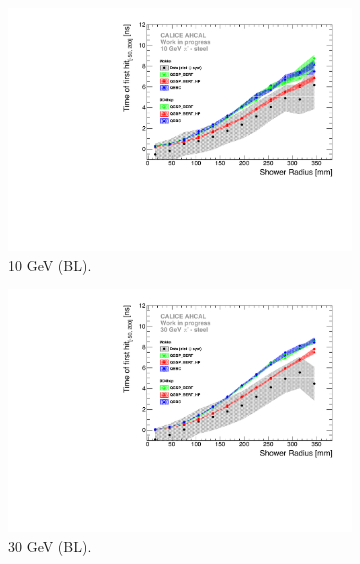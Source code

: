 \begin{figure}[htbp!]
	\begin{subfigure}[t]{0.5\textwidth}
		\centering
		\includegraphics[width=1\textwidth]{chap5/fig_AHCAL_timing/Pions/ComparisonToSim/Time_Radius_10GeV_BL.pdf}
		\caption{10 GeV (BL).}\label{fig:Radius_BL_SimData_10GeV}
	\end{subfigure}
	\hfill
	\begin{subfigure}[t]{0.5\textwidth}
		\centering
		\includegraphics[width=1\textwidth]{chap5/fig_AHCAL_timing/Pions/ComparisonToSim/Time_Radius_30GeV_BL.pdf}
		\caption{30 GeV (BL).} \label{fig:Radius_BL_SimData_30GeV}
	\end{subfigure}
	\hfill
	\begin{subfigure}[t]{0.5\textwidth}
		\centering

\end{subfigure}
\end{figure}
